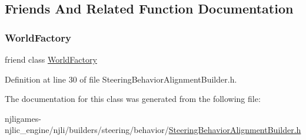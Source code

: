\subsection{Friends And Related Function Documentation}
\mbox{\label{classnjli_1_1_steering_behavior_alignment_builder_acb96ebb09abe8f2a37a915a842babfac}} 
\subsubsection{\texorpdfstring{World\+Factory}{WorldFactory}}
{\footnotesize\ttfamily friend class \mbox{\hyperlink{classnjli_1_1_world_factory}{World\+Factory}}\hspace{0.3cm}{\ttfamily [friend]}}



Definition at line 30 of file Steering\+Behavior\+Alignment\+Builder.\+h.



The documentation for this class was generated from the following file\+:\begin{DoxyCompactItemize}
\item 
njligames-\/njlic\+\_\+engine/njli/builders/steering/behavior/\mbox{\hyperlink{_steering_behavior_alignment_builder_8h}{Steering\+Behavior\+Alignment\+Builder.\+h}}\end{DoxyCompactItemize}
